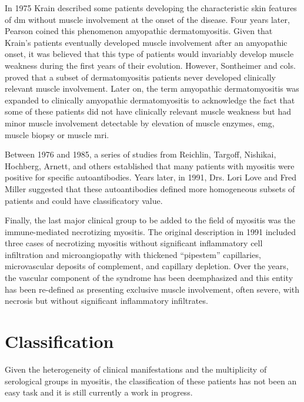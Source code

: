 In 1975 Krain\cite{Krain1975} described some patients developing the characteristic skin features of \gls{dm} without muscle involvement at the onset of the disease. Four years later, Pearson coined this phenomenon amyopathic dermatomyositis.\cite{Pearson1979} Given that Krain’s patients eventually developed muscle involvement after an amyopathic onset, it was believed that this type of patients would invariably develop muscle weakness during the first years of their evolution. However, Sontheimer and cols. proved that a subset of dermatomyositis patients never developed clinically relevant muscle involvement.\cite{Euwer1991} Later on, the term amyopathic dermatomyositis was expanded to clinically amyopathic dermatomyositis to acknowledge the fact that some of these patients did not have clinically relevant muscle weakness but had minor muscle involvement detectable by elevation of muscle enzymes, \gls{emg}, muscle biopsy or muscle \gls{mri}.\cite{Sontheimer2002}

Between 1976 and 1985, a series of studies from Reichlin, Targoff, Nishikai, Hochberg, Arnett, and others established that many patients with myositis were positive for specific autoantibodies.\cite{Nishikai1980,Targoff1985,Reichlin1976,Hochberg1984} Years later, in 1991, Drs. Lori Love and Fred Miller suggested that these autoantibodies defined more homogeneous subsets of patients and could have classificatory value.\cite{Love1991}

Finally, the last major clinical group to be added to the field of myositis was the immune-mediated necrotizing myositis. The original description in 1991\cite{EmslieSmith1991} included three cases of necrotizing myositis without significant inflammatory cell infiltration and microangiopathy with thickened “pipestem” capillaries, microvascular deposits of complement, and capillary depletion. Over the years, the vascular component of the syndrome has been deemphasized and this entity has been re-defined as presenting exclusive muscle involvement, often severe, with necrosis but without significant inflammatory infiltrates.

\section{Classification}

Given the heterogeneity of clinical manifestations and the multiplicity of serological groups in myositis, the classification of these patients has not been an easy task and it is still currently a work in progress.

